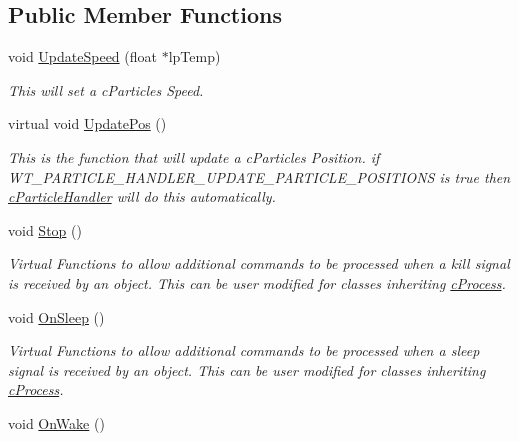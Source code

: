 \subsection*{Public Member Functions}
\begin{DoxyCompactItemize}
\item 
\hypertarget{classc_particle_a208780eb109c709449a2edd3f7867e51}{
void \hyperlink{classc_particle_a208780eb109c709449a2edd3f7867e51}{UpdateSpeed} (float $\ast$lpTemp)}
\label{classc_particle_a208780eb109c709449a2edd3f7867e51}

\begin{DoxyCompactList}\small\item\em This will set a cParticles Speed. \end{DoxyCompactList}\item 
\hypertarget{classc_particle_ac65d80b8caf075482086abd6c5323068}{
virtual void \hyperlink{classc_particle_ac65d80b8caf075482086abd6c5323068}{UpdatePos} ()}
\label{classc_particle_ac65d80b8caf075482086abd6c5323068}

\begin{DoxyCompactList}\small\item\em This is the function that will update a cParticles Position. if WT\_\-PARTICLE\_\-HANDLER\_\-UPDATE\_\-PARTICLE\_\-POSITIONS is true then \hyperlink{classc_particle_handler}{cParticleHandler} will do this automatically. \end{DoxyCompactList}\item 
\hypertarget{classc_particle_a94b9a55ebae44e8f72c96dcc7a3e934c}{
void \hyperlink{classc_particle_a94b9a55ebae44e8f72c96dcc7a3e934c}{Stop} ()}
\label{classc_particle_a94b9a55ebae44e8f72c96dcc7a3e934c}

\begin{DoxyCompactList}\small\item\em Virtual Functions to allow additional commands to be processed when a kill signal is received by an object. This can be user modified for classes inheriting \hyperlink{classc_process}{cProcess}. \end{DoxyCompactList}\item 
\hypertarget{classc_particle_a0585c3c23125de8ffa0ecc3e95c77ea3}{
void \hyperlink{classc_particle_a0585c3c23125de8ffa0ecc3e95c77ea3}{OnSleep} ()}
\label{classc_particle_a0585c3c23125de8ffa0ecc3e95c77ea3}

\begin{DoxyCompactList}\small\item\em Virtual Functions to allow additional commands to be processed when a sleep signal is received by an object. This can be user modified for classes inheriting \hyperlink{classc_process}{cProcess}. \end{DoxyCompactList}\item 
\hypertarget{classc_particle_ac46294a49ce7913343c1452f1c7b4007}{
void \hyperlink{classc_particle_ac46294a49ce7913343c1452f1c7b4007}{OnWake} ()}
\label{classc_particle_ac46294a49ce7913343c1452f1c7b4007}


\end{DoxyCompactItemize}
